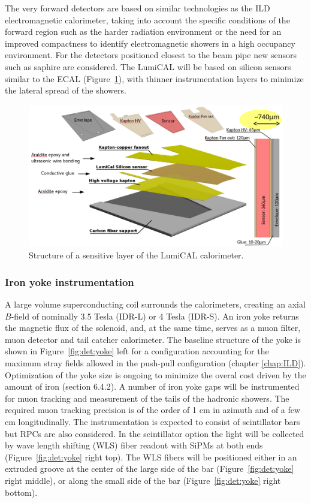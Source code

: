 The very forward detectors are based on similar technologies as the ILD electromagnetic calorimeter, taking into account the specific conditions of the forward region such as the harder radiation environment or the need for an improved compactness to identify electromagnetic showers in a high occupancy environment. For the detectors positioned closest to the beam pipe new sensors such as saphire are considered. The LumiCAL will be based on silicon sensors similar to the ECAL (Figure~\ref{fig:det:lumical}), with thinner instrumentation layers to minimize the lateral spread of the showers.     

\begin{figure}[t!]
\centering
\includegraphics[width=0.8\hsize]{Detector/fig/lumical_layer.png}
\caption{Structure of a sensitive layer of the LumiCAL calorimeter.}
\label{fig:det:lumical}
\end{figure}

\subsubsection*{Iron yoke instrumentation}

A large volume superconducting coil surrounds the calorimeters, creating an axial $B$-field of nominally 3.5 Tesla (IDR-L) or 4 Tesla (IDR-S). An iron yoke returns the magnetic flux of the solenoid, and, at the same time, serves as a muon filter, muon detector and tail catcher calorimeter. The baseline structure of the yoke is shown in Figure~\ref{fig:det:yoke} left for a configuration accounting for the maximum stray fields allowed in the push-pull configuration (chapter \ref{chap:ILD}). Optimization of the yoke size is ongoing to minimize the overal cost driven by the amount of iron (section 6.4.2). A number of iron yoke gaps will be instrumented for muon tracking and measurement of the tails of the hadronic showers. The required muon tracking precision is of the order of 1 cm in azimuth and of a few cm longitudinally. The instrumentation is expected to consist of scintillator bars but RPCs are also considered. In the scintillator option the light will be collected by wave length shifting (WLS) fiber readout with SiPMs at both ends~\cite{SavelievSiPM} (Figure~\ref{fig:det:yoke} right top). The WLS fibers will be positioned either in an extruded groove at the center of the large side of the bar (Figure~\ref{fig:det:yoke} right middle), or along the small side of the bar (Figure~\ref{fig:det:yoke} right bottom).  

